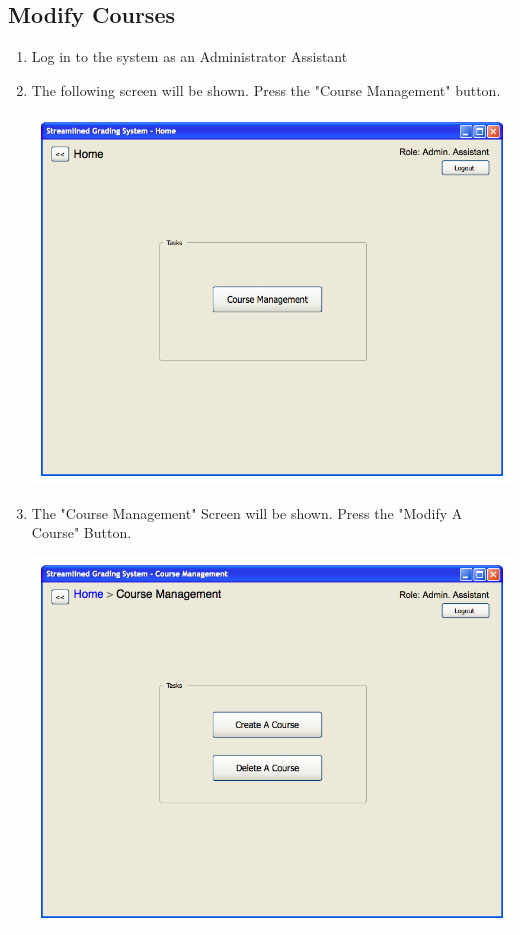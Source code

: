 \documentclass{article}
\begin{document}
\subsection{Modify Courses}
\begin{enumerate}
 \item Log in to the system as an Administrator Assistant
 \item The following screen will be shown. Press the "Course Management" button.
   \begin{center}
     \includegraphics[scale=0.55]{../images/UIMockups/pngs/adminassisthomepage}
   \end{center}
 \item The "Course Management" Screen will be shown.
   Press the "Modify A Course" Button.
   \begin{center}
     \includegraphics[scale=0.55]{../images/UIMockups/pngs/Coursemanagement}

\end{center}
\end{enumerate}
\end{document}
